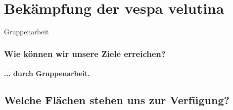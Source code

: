 \documentclass[aspectratio=169]{beamer}
\begin{document}
\section{Bekämpfung der vespa velutina}





\begin{frame}{Gruppenarbeit}
	\frametitle{Wie können wir unsere Ziele erreichen?} 
	\framesubtitle{... durch Gruppenarbeit.}
\end{frame}
\subsection[Flächen]{Welche Flächen stehen uns zur Verfügung?}
\end{document}

